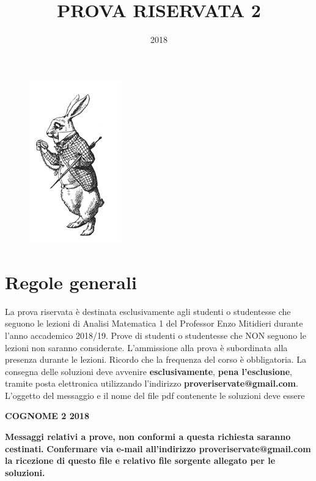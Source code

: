 \documentclass[12pt, oneside]{article}   	%
\title{PROVA RISERVATA 2}
\author{2018}
\begin{document}
\maketitle

\begin{figure}[ht!]
\centering
\includegraphics[width=40mm]{cunicio.jpg}
\end{figure}



\section{Regole generali}
La prova riservata \`e destinata esclusivamente agli studenti o studentesse che seguono le lezioni di Analisi Matematica 1 del Professor Enzo Mitidieri durante l'anno accademico 2018/19.  Prove di studenti o studentesse che NON seguono le lezioni non saranno considerate.
  L'ammissione alla prova \`e subordinata alla presenza durante le lezioni.
 Ricordo che la frequenza del corso \`e obbligatoria. La  consegna delle soluzioni deve avvenire {\bf esclusivamente}, {\bf pena l'esclusione},  tramite posta elettronica utilizzando l'indirizzo {\bf proveriservate@gmail.com}.
L'oggetto del messaggio e il nome del file pdf contenente le soluzioni deve essere
\bigskip


{\bf COGNOME  2  2018  }


 \bigskip
{\bf  Messaggi relativi a prove, non conformi a questa richiesta saranno cestinati.}
{\bf Confermare via e-mail all'indirizzo proveriservate@gmail.com la ricezione
di questo file e relativo file sorgente allegato per le soluzioni.}
\end{document}
